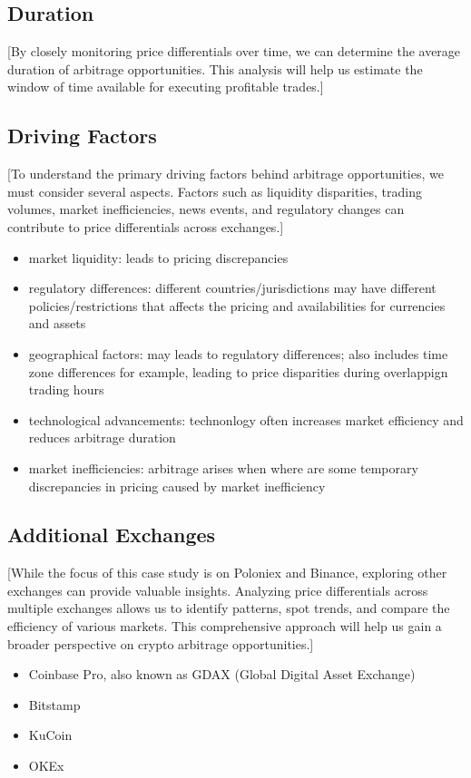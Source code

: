 \documentclass{article}
\begin{document}
\subsection{Duration}
[By closely monitoring price differentials over time, we can determine the average duration of arbitrage
opportunities. This analysis will help us estimate the window of time available for executing profitable
trades.]
\subsection{Driving Factors}
[To understand the primary driving factors behind arbitrage opportunities, we must consider several aspects. Factors such as liquidity disparities, trading volumes, market inefficiencies, news events, and regulatory changes can contribute to price differentials across exchanges.]
\begin{itemize}
  \item market liquidity: leads to pricing discrepancies
  \item regulatory differences: different countries/jurisdictions may have different policies/restrictions that affects the pricing and availabilities for currencies and assets
  \item geographical factors: may leads to regulatory differences; also includes time zone differences for example, leading to price disparities during overlappign trading hours
  \item technological advancements: technonlogy often increases market efficiency and reduces arbitrage duration
  \item market inefficiencies: arbitrage arises when where are some temporary discrepancies in pricing caused by market inefficiency
\end{itemize}
\subsection{Additional Exchanges}
[While the focus of this case study is on Poloniex and Binance, exploring other exchanges can provide valuable
insights. Analyzing price differentials across multiple exchanges allows us to identify patterns, spot trends,
and compare the efficiency of various markets. This comprehensive approach will help us gain a broader
perspective on crypto arbitrage opportunities.]
\begin{itemize}
  \item Coinbase Pro, also known as GDAX (Global Digital Asset Exchange)
  \item Bitstamp
  \item KuCoin
  \item OKEx
\end{itemize}
\end{document}
